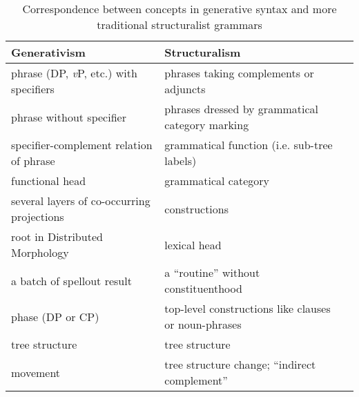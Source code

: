 \documentclass[UTF8, a4paper, oneside, scheme=plain, 12pt]{ctexbook}
\newcommand{\vP}{\textit{v}P}
\begin{document}
{\begin{table}[H]
    \caption{Correspondence between concepts in generative syntax and more traditional structuralist grammars}
    \label{tbl:theory.cgel}
    \centering
    \small
    \begin{tabular}{@{}lll@{}}
    \toprule
    Generativism                               & Structuralism                                          \\ \midrule
    phrase (DP, \vP, etc.) with specifiers     & phrases taking complements or adjuncts                        \\
    phrase without specifier                   & phrases dressed by grammatical category marking             \\
    specifier-complement relation of phrase    & grammatical function (i.e. sub-tree labels)  \\
    functional head                            & grammatical category                     \\
    several layers of co-occurring projections & constructions                                 \\
    root in Distributed Morphology             & lexical head                                          \\
    a batch of spellout result                 & a ``routine'' without constituenthood    \\
    phase (DP or CP)                           & top-level constructions like clauses or noun-phrases                          \\
    tree structure                             & tree structure  \\
    movement                                   & tree structure change; ``indirect complement''                            \\ \bottomrule
    \end{tabular}
\end{table}

}
\end{document}

